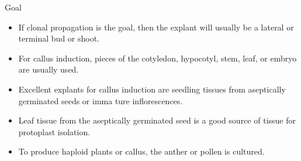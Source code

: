 \documentclass[
  ignorenonframetext,
  aspectratio=169]{beamer}
\providecommand{\tightlist}{%
  \setlength{\itemsep}{0pt}\setlength{\parskip}{0pt}}
\begin{document}
\begin{frame}{Goal}
\protect\hypertarget{goal}{}
\begin{itemize}
\tightlist
\item
  If clonal propagation is the goal, then the explant will usually be a
  lateral or terminal bud or shoot.
\item
  For callus induction, pieces of the cotyledon, hypocotyl, stem, leaf,
  or embryo are usually used.
\item
  Excellent explants for callus induction are seedling tissues from
  aseptically germinated seeds or imma ture inflorescences.
\item
  Leaf tissue from the aseptically germinated seed is a good source of
  tissue for protoplast isolation.
\item
  To produce haploid plants or callus, the anther or pollen is cultured.
\end{itemize}
\end{frame}
\end{document}
